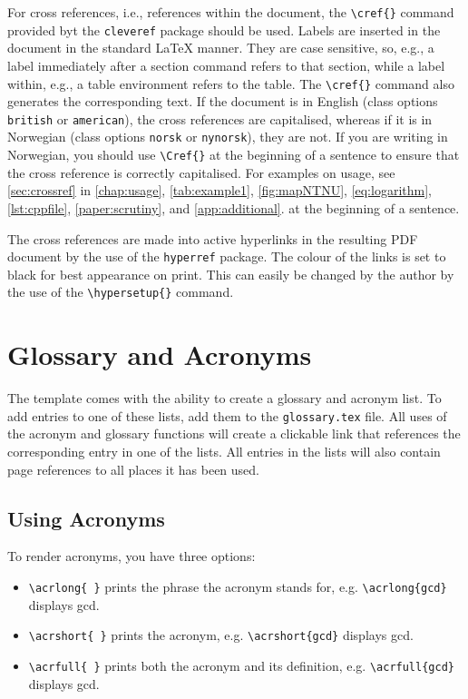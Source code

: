 For cross references, i.e., references within the document, the \texttt{\textbackslash cref\{\}} command provided byt the \texttt{cleveref} package should be used. Labels are inserted in the document in the standard \LaTeX{} manner. They are case sensitive, so, e.g., a label immediately after a section command refers to that section, while a label within, e.g., a table environment refers to the table. The \texttt{\textbackslash cref\{\}} command also generates the corresponding text. If the document is in English (class options \texttt{british} or \texttt{american}), the cross references are capitalised, whereas if it is in Norwegian (class options \texttt{norsk} or \texttt{nynorsk}), they are not. If you are writing in Norwegian, you should use \texttt{\textbackslash Cref\{\}} at the beginning of a sentence to ensure that the cross reference is correctly capitalised. For examples on usage, see \cref{sec:crossref} in \cref{chap:usage}, \cref{tab:example1}, \cref{fig:mapNTNU}, \cref{eq:logarithm}, \cref{lst:cppfile}, \cref{paper:scrutiny}, and \cref{app:additional}.  at the beginning of a sentence.

The cross references are made into active hyperlinks in the resulting PDF document by the use of the \texttt{hyperref} package. The colour of the links is set to black for best appearance on print. This can easily be changed by the author by the use of the \texttt{\textbackslash hypersetup\{\}} command.

\section{Glossary and Acronyms}
The template comes with the ability to create a glossary and acronym list. To add entries to one of these lists, add them to the \texttt{glossary.tex} file.
All uses of the acronym and glossary functions will create a clickable link that references the corresponding entry in one of the lists. All entries in the lists will also contain page references to all places it has been used.
\subsection{Using Acronyms}
To render acronyms, you have three options:
\begin{itemize}
  \item \texttt{\textbackslash acrlong\{ \}} prints the phrase the acronym stands for, e.g. \texttt{\textbackslash acrlong\{gcd\}} displays \acrlong{gcd}.
  \item \texttt{\textbackslash acrshort\{ \}} prints the acronym, e.g. \texttt{\textbackslash acrshort\{gcd\}} displays \acrshort{gcd}.
  \item \texttt{\textbackslash acrfull\{ \}} prints both the acronym and its definition, e.g. \texttt{\textbackslash acrfull\{gcd\}} displays \acrfull{gcd}.
\end{itemize}

